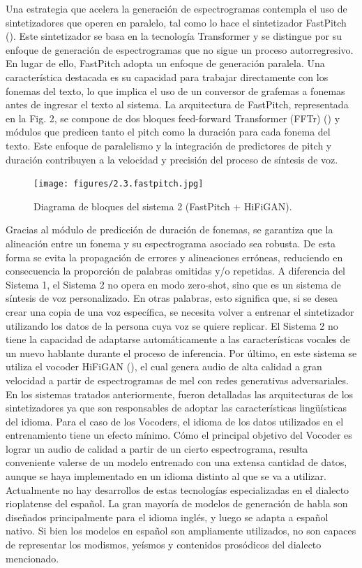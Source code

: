 Una estrategia que acelera la generación de espectrogramas contempla el uso de sintetizadores que operen en paralelo, tal como lo hace el sintetizador FastPitch (\cite{lancucki2021}). Este sintetizador se basa en la tecnología Transformer y se distingue por su enfoque de generación de espectrogramas que no sigue un proceso autorregresivo. En lugar de ello, FastPitch adopta un enfoque de generación paralela. Una característica destacada es su capacidad para trabajar directamente con los fonemas del texto, lo que implica el uso de un conversor de grafemas a fonemas antes de ingresar el texto al sistema. La arquitectura de FastPitch, representada en la Fig. 2, se compone de dos bloques feed-forward Transformer (FFTr) (\cite{ren2019}) y módulos que predicen tanto el pitch como la duración para cada fonema del texto. Este enfoque de paralelismo y la integración de predictores de pitch y duración contribuyen a la velocidad y precisión del proceso de síntesis de voz.

\begin{figure}[h]
    \centering
    \texttt{[image: figures/2.3.fastpitch.jpg]}
    \caption{Diagrama de bloques del sistema 2 (FastPitch + HiFiGAN).}
    \label{fig:2.3.fastpitch}
\end{figure}

Gracias al módulo de predicción de duración de fonemas, se garantiza que la alineación entre un fonema y su espectrograma asociado sea robusta. De esta forma se evita la propagación de errores y alineaciones erróneas, reduciendo en consecuencia la proporción de palabras omitidas y/o repetidas. A diferencia del Sistema 1, el Sistema 2 no opera en modo zero-shot, sino que es un sistema de síntesis de voz personalizado. En otras palabras, esto significa que, si se desea crear una copia de una voz específica, se necesita volver a entrenar el sintetizador utilizando los datos de la persona cuya voz se quiere replicar. El Sistema 2 no tiene la capacidad de adaptarse automáticamente a las características vocales de un nuevo hablante durante el proceso de inferencia. Por último, en este sistema se utiliza el vocoder HiFiGAN (\cite{kong2020}), el cual genera audio de alta calidad a gran velocidad a partir de espectrogramas de mel con redes generativas adversariales.
En los sistemas tratados anteriormente, fueron detalladas las arquitecturas de los sintetizadores ya que son responsables de adoptar las características lingüísticas del idioma. Para el caso de los Vocoders, el idioma de los datos utilizados en el entrenamiento tiene un efecto mínimo. Cómo el principal objetivo del Vocoder es lograr un audio de calidad a partir de un cierto espectrograma, resulta conveniente valerse de un modelo entrenado con una extensa cantidad de datos, aunque se haya implementado en un idioma distinto al que se va a utilizar.
Actualmente no hay desarrollos de estas tecnologías especializadas en el dialecto rioplatense del español. La gran mayoría de modelos de generación de habla son diseñados principalmente para el idioma inglés, y luego se adapta a español nativo. Si bien los modelos en español son ampliamente utilizados, no son capaces de representar los modismos, yeísmos y contenidos prosódicos del dialecto mencionado.


